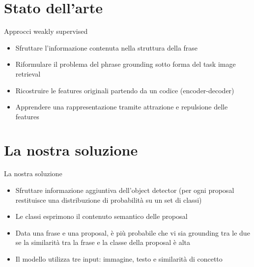 \documentclass{beamer}
\begin{document}
\section{Stato dell'arte}

\begin{frame}{Approcci weakly supervised}
  \begin{itemize}
    \item Sfruttare l'informazione contenuta nella \alert{struttura
    della frase}
    \item Riformulare il problema del phrase grounding sotto forma del
    task \alert{image retrieval}
    \item \alert{Ricostruire} le features originali partendo da un
    codice (encoder-decoder)
    \item Apprendere una rappresentazione tramite
    \alert{attrazione e repulsione} delle features
  \end{itemize}
\end{frame}

\section{La nostra soluzione}

\begin{frame}{La nostra soluzione}
  \begin{itemize}
    \item Sfruttare informazione aggiuntiva dell'object detector (per
    ogni proposal restituisce una \alert{distribuzione di probabilità}
    su un set di classi)
    \item Le classi esprimono il \alert{contenuto semantico} delle
    proposal
    \item Data una frase e una proposal, è più probabile che vi sia
    grounding tra le due se la \alert{similarità} tra la frase e la
    classe della proposal è alta
    \vspace{0.5cm}
    \item Il modello utilizza \alert{tre input}: immagine, testo e
    similarità di concetto 
  \end{itemize}
\end{frame}
\end{document}
